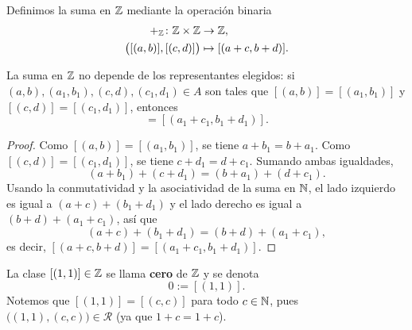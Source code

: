 \documentclass[12pt,a4paper]{book}
\begin{document}
    \begin{definicion}[Suma en $\Z$]
        \label{def:suma-Z}
        Definimos la suma en $\Z$ mediante la operación binaria
        \begin{align*}
            +_{\mathbb{Z}}\colon\mathbb{Z}\times\mathbb{Z}&\to\mathbb{Z},\\
            \big([(a,b)],[(c,d)]\big)&\mapsto[(a+c,b+d)].
        \end{align*}
    \end{definicion}

    \begin{proposicion}
        \label{prop:suma-Z-bien-definida}
        La suma en $\Z$ no depende de los representantes elegidos: si $(a,b),(a_{1},b_{1}),(c,d),(c_{1},d_{1})\in A$ son tales que $[(a,b)]=[(a_{1},b_{1})]$ y $[(c,d)]=[(c_{1},d_{1})]$, entonces
        \begin{equation*}
            [(a+c,b+d)] = [(a_{1}+c_{1},b_{1}+d_{1})].
        \end{equation*}
    \end{proposicion}
    \begin{proof}
        Como $[(a,b)]=[(a_{1},b_{1})]$, se tiene $a+b_{1}=b+a_{1}$. Como $[(c,d)]=[(c_{1},d_{1})]$, se tiene $c+d_{1}=d+c_{1}$. Sumando ambas igualdades,
        \begin{equation*}
            (a+b_{1})+(c+d_{1}) = (b+a_{1})+(d+c_{1}).
        \end{equation*}
        Usando la conmutatividad y la asociatividad de la suma en $\mathbb{N}$, el lado izquierdo es igual a $(a+c)+(b_{1}+d_{1})$ y el lado derecho es igual a $(b+d)+(a_{1}+c_{1})$, así que
        \begin{equation*}
            (a+c)+(b_{1}+d_{1}) = (b+d)+(a_{1}+c_{1}),
        \end{equation*}
        es decir, $[(a+c,b+d)]=[(a_{1}+c_{1},b_{1}+d_{1})]$.
    \end{proof}

    \begin{definicion}[Cero de $\Z$]
        \label{def:cero-Z}
        La clase $[(1,1)]\in\mathbb{Z}$ se llama \textbf{cero} de $\Z$ y se denota
        \begin{equation*}
            0 := [(1,1)].
        \end{equation*}
        Notemos que $[(1,1)]=[(c,c)]$ para todo $c\in\mathbb{N}$, pues $\big((1,1),(c,c)\big)\in\mathcal{R}$ (ya que $1+c=1+c$).
    \end{definicion}
\end{document}
